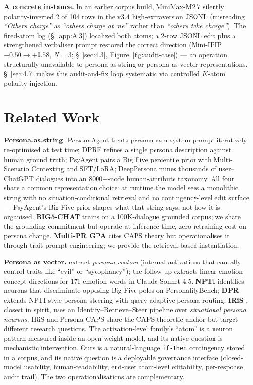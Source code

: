 \textbf{A concrete instance.} In an earlier corpus build, MiniMax-M2.7 silently polarity-inverted 2 of 104 rows in the v3.4 high-extraversion JSONL (misreading \textit{``Others charge''} as \textit{``others charge at me''} rather than \textit{``others take charge''}). The fired-atom log (\S~\ref{app:A.3}) localized both atoms; a 2-row JSONL edit plus a strengthened verbaliser prompt restored the correct direction (Mini-IPIP $-0.50 \to +0.58$, $N = 3$; \S~\ref{sec:4.3}, Figure~\ref{fig:audit-case}) --- an operation structurally unavailable to persona-as-string or persona-as-vector representations. \S~\ref{sec:4.7} makes this audit-and-fix loop systematic via controlled $K$-atom polarity injection.

\section{Related Work}
\label{sec:2}

\textbf{Persona-as-string.} PersonaAgent \cite{personaagent2025} treats persona as a system prompt iteratively re-optimised at test time; DPRF \cite{dprf2025} refines a single persona description against human ground truth; PsyAgent \cite{psyagent2026} pairs a Big Five percentile prior with Multi-Scenario Contexting and SFT/LoRA; DeepPersona \cite{deeppersona2025} mines thousands of user--ChatGPT dialogues into an 8000+-node human-attribute taxonomy. All four share a common representation choice: at runtime the model sees a monolithic string with no situation-conditional retrieval and no contingency-level edit surface --- PsyAgent's Big Five prior shapes what that string says, not how it is organised. \textbf{BIG5-CHAT} \cite{big5chat2025} trains on a 100K-dialogue grounded corpus; we share the grounding commitment but operate at inference time, zero retraining cost on persona change. \textbf{Multi-PR GPA} \cite{multiprgpa2025} cites CAPS theory but operationalises it through trait-prompt engineering; we provide the retrieval-based instantiation.

\textbf{Persona-as-vector.} \citet{anthropic2025personas} extract \textit{persona vectors} (internal activations that causally control traits like ``evil'' or ``sycophancy''); the follow-up \cite{anthropic2026emotion} extracts linear emotion-concept directions for 171 emotion words in Claude Sonnet 4.5. \textbf{NPTI} \cite{NPTI} identifies neurons that discriminate opposing Big-Five poles on PersonalityBench; \textbf{DPR} \cite{DPR} extends NPTI-style persona steering with query-adaptive persona routing; \textbf{IRiS} \cite{IRiS}, closest in spirit, uses an Identify--Retrieve--Steer pipeline over \textit{situational persona neurons}. IRiS and Persona-CAPS share the CAPS-theoretic anchor but target different research questions. The activation-level family's ``atom'' is a neuron pattern measured inside an open-weight model, and its native question is mechanistic intervention. Ours is a natural-language \texttt{if-\allowbreak{}then} contingency stored in a corpus, and its native question is a deployable governance interface (closed-model usability, human-readability, end-user atom-level editability, per-response audit trail). The two operationalisations are complementary.

